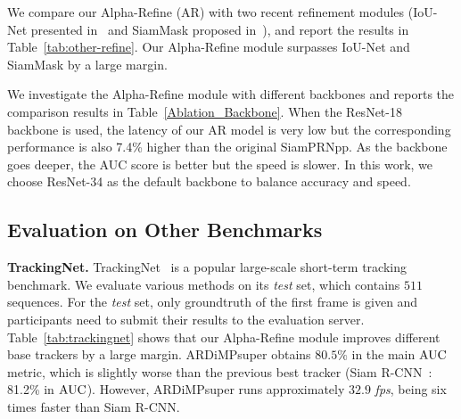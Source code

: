 \documentclass[final]{cvpr}
\begin{document}
We compare our Alpha-Refine (AR) with two recent refinement modules (IoU-Net presented in~\cite{ATOM,DiMP} 
and SiamMask proposed in~\cite{SiamMask}), and report the results in Table~\ref{tab:other-refine}. 
Our Alpha-Refine module surpasses IoU-Net and SiamMask by a large margin.


We investigate the Alpha-Refine module with different backbones and reports the comparison results in 
Table~\ref{Ablation_Backbone}. 
When the ResNet-18 backbone is used, the latency of our AR model is very low but the corresponding 
performance is also 7.4\% higher than the original SiamPRNpp.
As the backbone goes deeper, the AUC score is better but the speed is slower. In this work, we choose 
ResNet-34 as the default backbone to balance accuracy and speed. 
\begin{table}[h]
\caption{Accuracy and Speed Comparison of SiamRPNpp+AR with different backbones. \label{Ablation_Backbone}}
\vspace{-2mm}
\begin{center}
\end{center}
\vspace{-6mm}
\end{table}

\subsection{Evaluation on Other Benchmarks}
\label{sec_sota}
{\noindent \textbf{TrackingNet.}}
TrackingNet~\cite{Trackingnet} is a popular large-scale short-term tracking benchmark. 
We evaluate various methods on its \emph{test} set, which contains $511$ sequences.
For the \emph{test} set, only groundtruth of the first frame is given and participants 
need to submit their results to the evaluation server.  
Table~\ref{tab:trackingnet} shows that our Alpha-Refine module improves different  
base trackers by a large margin. 
ARDiMPsuper obtains $80.5\%$ in the main $\rm{AUC}$ metric, which is slightly worse 
than the previous best tracker (Siam R-CNN~\cite{SiamRCNN}: 81.2\% in $\rm{AUC}$). 
However, ARDiMPsuper runs approximately $32.9$ \emph{fps}, being six times faster than Siam R-CNN. 
\end{document}
